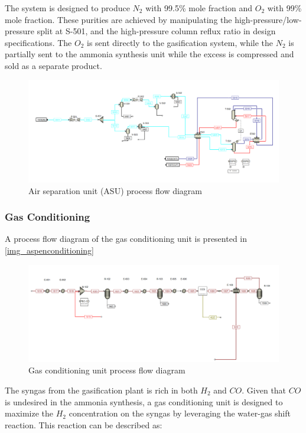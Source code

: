 \documentclass[a4paper, titlepage]{article}
\begin{document}
The system is designed to produce $N_2$ with 99.5\% mole fraction and $O_2$ with 99\% mole fraction. These purities
are achieved by manipulating the high-pressure/low-pressure split at S-501, and the high-pressure column 
reflux ratio in design specifications. The $O_2$ is sent directly to the gasification system, while the $N_2$ is 
partially sent to the ammonia synthesis unit while the excess is compressed and sold as a separate product.

\begin{figure}
	\includegraphics[width=\textwidth]{img/aspen_asu.png}
	\caption{Air separation unit (ASU) process flow diagram}
	\label{img_aspenasu}
\end{figure}

\subsubsection{Gas Conditioning}

A process flow diagram of the gas conditioning unit is presented in \autoref{img_aspenconditioning}

\begin{figure}
	\includegraphics[width=\textwidth]{img/aspen_conditioning.png}
	\caption{Gas conditioning unit process flow diagram}
	\label{img_aspenconditioning}
\end{figure}

The syngas from the gasification plant is rich in both $H_2$ and $CO$. Given that $CO$ is undesired in the 
ammonia synthesis, a gas conditioning unit is designed to maximize the $H_2$ concentration on the syngas by leveraging 
the water-gas shift reaction. This reaction can be described as:
\end{document}
